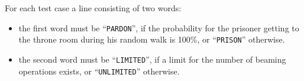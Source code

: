 \begin{Output}
    For each test case a line consisting of two words:
    \begin{itemize}
    	\item the first word must be ``\texttt{PARDON}'', if the probability for the prisoner getting to the throne room during his random walk is 100\%, or ``\texttt{PRISON}'' otherwise.
    	\item the second word must be ``\texttt{LIMITED}'', if a limit for the number of beaming operations exists, or ``\texttt{UNLIMITED}'' otherwise.
    \end{itemize}
\end{Output}
